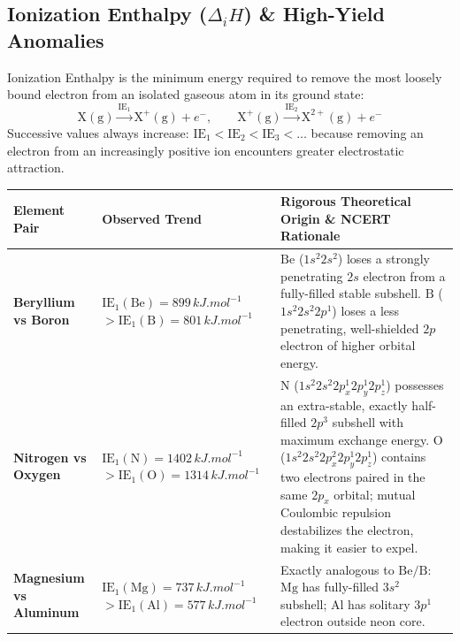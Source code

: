 \documentclass[10pt,a4paper]{article}
\begin{document}
\subsection{Ionization Enthalpy ($\Delta_i H$) \& High-Yield Anomalies}
Ionization Enthalpy is the minimum energy required to remove the most loosely bound electron from an isolated gaseous atom in its ground state:
\begin{equation}
  \mathrm{X(g)} \xrightarrow{\text{IE}_1} \mathrm{X^+(g)} + e^-, \qquad \mathrm{X^+(g)} \xrightarrow{\text{IE}_2} \mathrm{X^{2+}(g)} + e^-
\end{equation}
Successive values always increase: $\text{IE}_1 < \text{IE}_2 < \text{IE}_3 < \dots$ because removing an electron from an increasingly positive ion encounters greater electrostatic attraction.

\begin{table}[htbp]
\centering
\small
\renewcommand{\arraystretch}{1.3}
\begin{tabularx}{\textwidth}{p{3.2cm} p{4.2cm} p{8.8cm}}
\toprule
\textbf{Element Pair} & \textbf{Observed Trend} & \textbf{Rigorous Theoretical Origin \& NCERT Rationale} \\
\midrule
\textbf{Beryllium vs Boron} & $\text{IE}_1(\mathrm{Be}) = 899\,\si{kJ.mol^{-1}}$ \newline $> \text{IE}_1(\mathrm{B}) = 801\,\si{kJ.mol^{-1}}$ & $\mathrm{Be}$ ($1s^2 2s^2$) loses a strongly penetrating $2s$ electron from a fully-filled stable subshell. $\mathrm{B}$ ($1s^2 2s^2 2p^1$) loses a less penetrating, well-shielded $2p$ electron of higher orbital energy. \\
\midrule
\textbf{Nitrogen vs Oxygen} & $\text{IE}_1(\mathrm{N}) = 1402\,\si{kJ.mol^{-1}}$ \newline $> \text{IE}_1(\mathrm{O}) = 1314\,\si{kJ.mol^{-1}}$ & $\mathrm{N}$ ($1s^2 2s^2 2p_x^1 2p_y^1 2p_z^1$) possesses an extra-stable, exactly half-filled $2p^3$ subshell with maximum exchange energy. $\mathrm{O}$ ($1s^2 2s^2 2p_x^2 2p_y^1 2p_z^1$) contains two electrons paired in the same $2p_x$ orbital; mutual Coulombic repulsion destabilizes the electron, making it easier to expel. \\
\midrule
\textbf{Magnesium vs Aluminum} & $\text{IE}_1(\mathrm{Mg}) = 737\,\si{kJ.mol^{-1}}$ \newline $> \text{IE}_1(\mathrm{Al}) = 577\,\si{kJ.mol^{-1}}$ & Exactly analogous to $\mathrm{Be/B}$: $\mathrm{Mg}$ has fully-filled $3s^2$ subshell; $\mathrm{Al}$ has solitary $3p^1$ electron outside neon core. \\

\end{tabularx}
\end{table}
\end{document}
